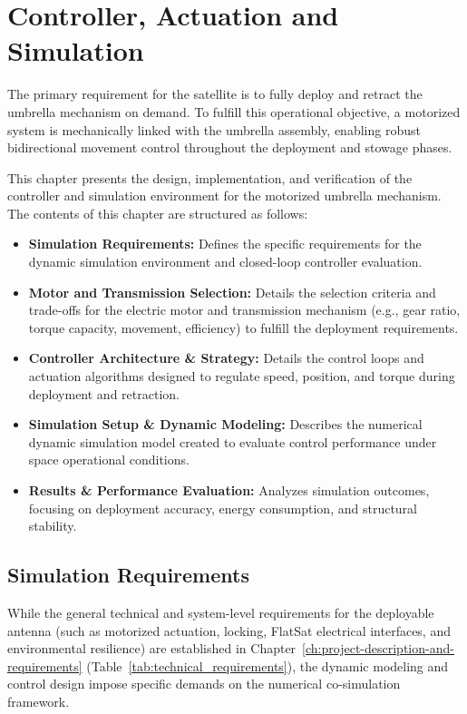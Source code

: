 \chapter{Controller, Actuation and Simulation}
\label{ch:controller-and-simulation}

The primary requirement for the satellite is to fully deploy and retract the umbrella mechanism on demand. To fulfill this operational objective, a motorized system is mechanically linked with the umbrella assembly, enabling robust bidirectional movement control throughout the deployment and stowage phases.

This chapter presents the design, implementation, and verification of the controller and simulation environment for the motorized umbrella mechanism. The contents of this chapter are structured as follows:

\begin{itemize}
    \item \textbf{Simulation Requirements:} Defines the specific requirements for the dynamic simulation environment and closed-loop controller evaluation.
    \item \textbf{Motor and Transmission Selection:} Details the selection criteria and trade-offs for the electric motor and transmission mechanism (e.g., gear ratio, torque capacity, movement, efficiency) to fulfill the deployment requirements.
    \item \textbf{Controller Architecture \& Strategy:} Details the control loops and actuation algorithms designed to regulate speed, position, and torque during deployment and retraction.
    \item \textbf{Simulation Setup \& Dynamic Modeling:} Describes the numerical dynamic simulation model created to evaluate control performance under space operational conditions.
    \item \textbf{Results \& Performance Evaluation:} Analyzes simulation outcomes, focusing on deployment accuracy, energy consumption, and structural stability.
\end{itemize}

\newpage    
\section{Simulation Requirements}
\label{sec:simulation-requirements}

While the general technical and system-level requirements for the deployable antenna (such as motorized actuation, locking, FlatSat electrical interfaces, and environmental resilience) are established in Chapter~\ref{ch:project-description-and-requirements} (Table~\ref{tab:technical_requirements}), the dynamic modeling and control design impose specific demands on the numerical co-simulation framework.

